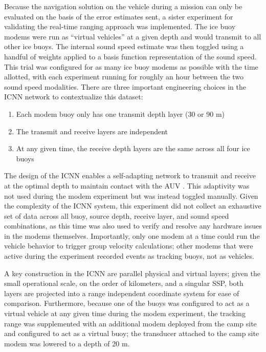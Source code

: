 Because the navigation solution on the vehicle during a mission can only be evaluated on the basis of the error estimates sent, a sister experiment for validating the real-time ranging approach was implemented.
The ice buoy modems were run as ``virtual vehicles'' at a given depth and would transmit to all other ice buoys.
The internal sound speed estimate was then toggled using a handful of weights applied to a basis function representation of the sound speed.
This trial was configured for as many ice buoy modems as possible with the time allotted, with each experiment running for roughly an hour between the two sound speed modalities.
There are three important engineering choices in the ICNN network to contextualize this dataset:
\begin{enumerate}
\item Each modem buoy only has one transmit depth layer (30 or 90 m)
\item The transmit and receive layers are independent
\item At any given time, the receive depth layers are the same across all four ice buoys
\end{enumerate}

The design of the ICNN enables a self-adapting network to transmit and receive at the optimal depth to maintain contact with the AUV \citep{schneider_self-adapting_2020}.
This adaptivity was not used during the modem experiment but was instead toggled manually.
Given the complexity of the ICNN system, this experiment did not collect an exhaustive set of data across all buoy, source depth, receive layer, and sound speed combinations, as this time was also used to verify and resolve any hardware issues in the modems themselves.
Importantly, only one modem at a time could run the vehicle behavior to trigger group velocity calculations; other modems that were active during the experiment recorded events as tracking buoys, not as vehicles.

A key construction in the ICNN are parallel physical and virtual layers; given the small operational scale, on the order of kilometers, and a singular SSP, both layers are projected into a range independent coordinate system for ease of comparison. Furthermore, because one of the buoys was configured to act as a virtual vehicle at any given time during the modem experiment, the tracking range was supplemented with an additional modem deployed from the camp site and configured to act as a virtual buoy; the transducer attached to the camp site modem was lowered to a depth of 20 m.


